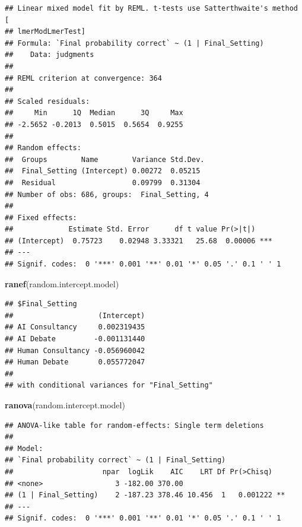 \documentclass[
]{article}
\newenvironment{Shaded}{\begin{snugshade}}{\end{snugshade}}
\newcommand{\FunctionTok}[1]{\textcolor[rgb]{0.13,0.29,0.53}{\textbf{#1}}}
\newcommand{\NormalTok}[1]{#1}
\begin{document}
\begin{verbatim}
## Linear mixed model fit by REML. t-tests use Satterthwaite's method [
## lmerModLmerTest]
## Formula: `Final probability correct` ~ (1 | Final_Setting)
##    Data: judgments
## 
## REML criterion at convergence: 364
## 
## Scaled residuals: 
##     Min      1Q  Median      3Q     Max 
## -2.5652 -0.2013  0.5015  0.5654  0.9255 
## 
## Random effects:
##  Groups        Name        Variance Std.Dev.
##  Final_Setting (Intercept) 0.00272  0.05215 
##  Residual                  0.09799  0.31304 
## Number of obs: 686, groups:  Final_Setting, 4
## 
## Fixed effects:
##             Estimate Std. Error      df t value Pr(>|t|)    
## (Intercept)  0.75723    0.02948 3.33321   25.68  0.00006 ***
## ---
## Signif. codes:  0 '***' 0.001 '**' 0.01 '*' 0.05 '.' 0.1 ' ' 1
\end{verbatim}

\begin{Shaded}
\begin{Highlighting}[]
\FunctionTok{ranef}\NormalTok{(random.intercept.model)}
\end{Highlighting}
\end{Shaded}

\begin{verbatim}
## $Final_Setting
##                    (Intercept)
## AI Consultancy     0.002319435
## AI Debate         -0.001131440
## Human Consultancy -0.056960042
## Human Debate       0.055772047
## 
## with conditional variances for "Final_Setting"
\end{verbatim}

\begin{Shaded}
\begin{Highlighting}[]
\FunctionTok{ranova}\NormalTok{(random.intercept.model)}
\end{Highlighting}
\end{Shaded}

\begin{verbatim}
## ANOVA-like table for random-effects: Single term deletions
## 
## Model:
## `Final probability correct` ~ (1 | Final_Setting)
##                     npar  logLik    AIC    LRT Df Pr(>Chisq)   
## <none>                 3 -182.00 370.00                        
## (1 | Final_Setting)    2 -187.23 378.46 10.456  1   0.001222 **
## ---
## Signif. codes:  0 '***' 0.001 '**' 0.01 '*' 0.05 '.' 0.1 ' ' 1
\end{verbatim}
\end{document}

